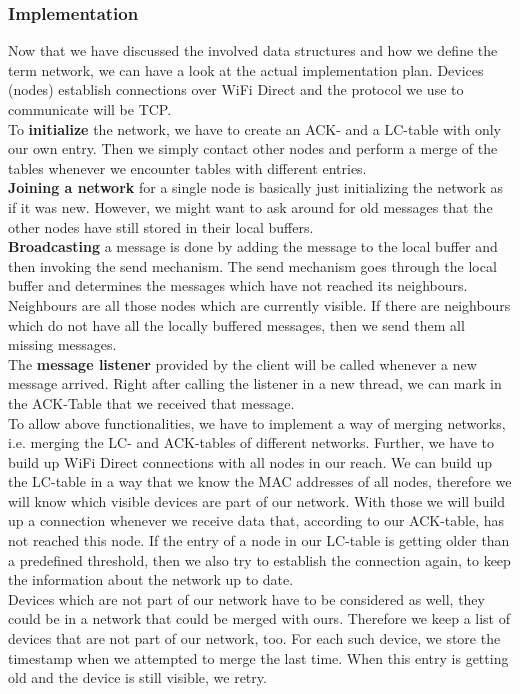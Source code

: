 	\subsubsection{Implementation}
Now that we have discussed the involved data structures and how we define the term network, we can have a look at the actual implementation plan. Devices (nodes) establish connections over WiFi Direct and the protocol we use to communicate will be TCP.\\
To \textbf{initialize} the network, we have to create an ACK- and a LC-table with only our own entry. Then we simply contact other nodes and perform a merge of the tables whenever we encounter tables with different entries. \\
\textbf{Joining a network} for a single node is basically just initializing the network as if it was new. However, we might want to ask around for old messages that the other nodes have still stored in their local buffers. \\ 
\textbf{Broadcasting} a message is done by adding the message to the local buffer and then invoking the send mechanism. The send mechanism goes through the local buffer and determines the messages which have not reached its neighbours. Neighbours are all those nodes which are currently visible. If there are neighbours which do not have all the locally buffered messages, then we send them all missing messages.\\
The \textbf{message listener} provided by the client will be called whenever a new message arrived. Right after calling the listener in a new thread, we can mark in the ACK-Table that we received that message.  \\
To allow above functionalities, we have to implement a way of merging networks, i.e. merging the LC- and ACK-tables of different networks. Further, we have to build up WiFi Direct connections with all nodes in our reach. We can build up the LC-table in a way that we know the MAC addresses of all nodes, therefore we will know which visible devices are part of our network. With those we will build up a connection whenever we receive data that, according to our ACK-table, has not reached this node. If the entry of a node in our LC-table is getting older than a predefined threshold, then we also try to establish the connection again, to keep the information about the network up to date. \\
Devices which are not part of our network have to be considered as well, they could be in a network that could be merged with ours. Therefore we keep a list of devices that are not part of our network, too. For each such device, we store the timestamp when we attempted to merge the last time. When this entry is getting old and the device is still visible, we retry. \\

